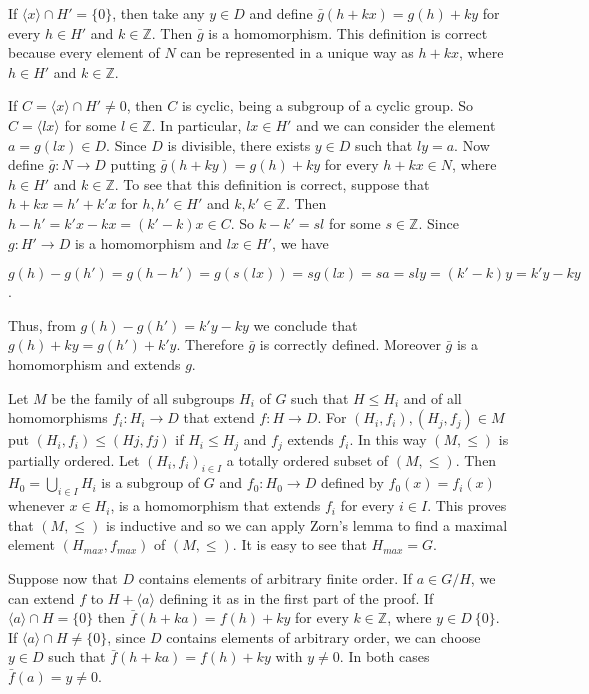 \documentclass[12pt]{article}
\begin{document}
    If $ \langle x \rangle \cap H' = \{0\} $, then take any $ y \in D $ and define $ \bar{g}(h + kx) = g(h) + ky $ for every $ h \in H' $ and $ k \in \mathbb{Z} $. Then
$ \bar{g} $ is a homomorphism. This definition is correct because every element of $ N $ can be represented in a unique way
as $ h + kx $, where $ h \in H' $ and $ k \in \mathbb{Z} $.


    If $ C = \langle x \rangle \cap H' \neq {0} $, then $ C $ is cyclic, being a subgroup of a cyclic group. So $ C = \langle lx \rangle $ for some $l \in \mathbb{Z} $.
In particular, $ lx \in H' $ and we can consider the element $ a = g(lx) \in D $. Since $ D $ is divisible, there exists $ y \in D $
such that $ly = a$. Now define $ \bar{g} : N \to D $ putting $ \bar{g}(h + ky) = g(h) + ky $ for every $ h + kx \in N $, where $ h \in H' $
and $ k \in \mathbb{Z} $. To see that this definition is correct, suppose that $h + kx = h' + k'x$ for $ h, h' \in H' $ and $ k, k' \in \mathbb{Z} $.
Then $ h - h' = k'x - kx = (k' - k)x \in C $. So $k - k' = sl$ for some $ s \in \mathbb{Z} $. Since $ g : H' \to D $ is a homomorphism
and $ lx \in H' $, we have


$ g(h) - g(h') = g(h - h') = g(s(lx)) = sg(lx) = sa = sly = (k' - k)y = k'y - ky $.


    Thus, from $ g(h) - g(h') = k'y - ky $ we conclude that $ g(h) + ky = g(h') + k'y $. Therefore $ \bar{g} $ is correctly defined.
Moreover $ \bar{g} $ is a homomorphism and extends $ g $.


    Let $ M $ be the family of all subgroups $ H_i $ of $ G $ such that $ H \leq H_i $ and of all homomorphisms $ f_i : H_i \to D $
that extend $ f : H \to D $. For $ (H_i, f_i),(H_j , f_j ) \in M $ put $ (H_i, f_i) \leq (Hj , fj ) $ if $ H_i \leq H_j $ and $ f_j $ extends $ f_i $. In this
way $ (M, \leq) $ is partially ordered. Let $ {(H_i, f_i)}_{i \in I} $ a totally ordered subset of $ (M, \leq) $. Then $ H_0 = \bigcup_{i \in I} H_i $ is a
subgroup of $ G $ and $ f_0 : H_0 \to D $ defined by $ f_0 (x) = f_i (x) $ whenever $ x \in H_i $, is a homomorphism that extends
$ f_i $ for every $ i \in I $. This proves that $ (M, \leq) $ is inductive and so we can apply Zorn's lemma to find a maximal
element $ (H_{max}, f_{max}) $ of $ (M, \leq) $. It is easy to see that $ H_{max} = G $.


    Suppose now that $ D $ contains elements of arbitrary finite order. If $ a \in G / H $, we can extend $ f $ to $ H + \langle a \rangle $
defining it as in the first part of the proof. If $ \langle a \rangle \cap H = \{0\}$ then $ \bar{f}(h + ka) = f(h) + ky $ for every $ k \in \mathbb{Z} $, where
$ y \in D \ \{0\} $. If $ \langle a \rangle \cap H \neq \{0\} $, since $ D $ contains elements of arbitrary order, we can choose $ y \in D $ such that
$ \bar{f}(h + ka) = f(h) + ky $ with $ y \neq 0 $. In both cases $ \bar{f}(a) = y \neq 0 $.
\end{document}
